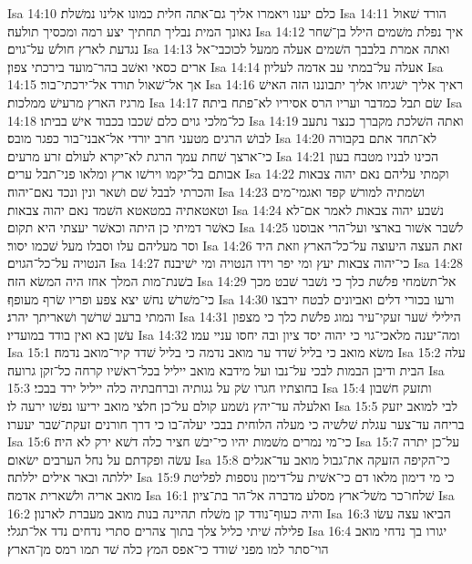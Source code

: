 Isa 14:10  כלם יענו ויאמרו אליך גם־אתה חלית כמונו אלינו נמשׁלת׃
Isa 14:11  הורד שׁאול גאונך המית נבליך תחתיך יצע רמה ומכסיך תולעה׃
Isa 14:12  איך נפלת משׁמים הילל בן־שׁחר נגדעת לארץ חולשׁ על־גוים׃
Isa 14:13  ואתה אמרת בלבבך השׁמים אעלה ממעל לכוכבי־אל ארים כסאי ואשׁב בהר־מועד בירכתי צפון׃
Isa 14:14  אעלה על־במתי עב אדמה לעליון׃
Isa 14:15  אך אל־שׁאול תורד אל־ירכתי־בור׃
Isa 14:16  ראיך אליך ישׁגיחו אליך יתבוננו הזה האישׁ מרגיז הארץ מרעישׁ ממלכות׃
Isa 14:17  שׂם תבל כמדבר ועריו הרס אסיריו לא־פתח ביתה׃
Isa 14:18  כל־מלכי גוים כלם שׁכבו בכבוד אישׁ בביתו׃
Isa 14:19  ואתה השׁלכת מקברך כנצר נתעב לבושׁ הרגים מטעני חרב יורדי אל־אבני־בור כפגר מובס׃
Isa 14:20  לא־תחד אתם בקבורה כי־ארצך שׁחת עמך הרגת לא־יקרא לעולם זרע מרעים׃
Isa 14:21  הכינו לבניו מטבח בעון אבותם בל־יקמו וירשׁו ארץ ומלאו פני־תבל ערים׃
Isa 14:22  וקמתי עליהם נאם יהוה צבאות והכרתי לבבל שׁם ושׁאר ונין ונכד נאם־יהוה׃
Isa 14:23  ושׂמתיה למורשׁ קפד ואגמי־מים וטאטאתיה במטאטא השׁמד נאם יהוה צבאות׃
Isa 14:24  נשׁבע יהוה צבאות לאמר אם־לא כאשׁר דמיתי כן היתה וכאשׁר יעצתי היא תקום׃
Isa 14:25  לשׁבר אשׁור בארצי ועל־הרי אבוסנו וסר מעליהם עלו וסבלו מעל שׁכמו יסור׃
Isa 14:26  זאת העצה היעוצה על־כל־הארץ וזאת היד הנטויה על־כל־הגוים׃
Isa 14:27  כי־יהוה צבאות יעץ ומי יפר וידו הנטויה ומי ישׁיבנה׃
Isa 14:28  בשׁנת־מות המלך אחז היה המשׂא הזה׃
Isa 14:29  אל־תשׂמחי פלשׁת כלך כי נשׁבר שׁבט מכך כי־משׁרשׁ נחשׁ יצא צפע ופריו שׂרף מעופף׃
Isa 14:30  ורעו בכורי דלים ואביונים לבטח ירבצו והמתי ברעב שׁרשׁך ושׁאריתך יהרג׃
Isa 14:31  הילילי שׁער זעקי־עיר נמוג פלשׁת כלך כי מצפון עשׁן בא ואין בודד במועדיו׃
Isa 14:32  ומה־יענה מלאכי־גוי כי יהוה יסד ציון ובה יחסו עניי עמו׃
Isa 15:1  משׂא מואב כי בליל שׁדד ער מואב נדמה כי בליל שׁדד קיר־מואב נדמה׃
Isa 15:2  עלה הבית ודיבן הבמות לבכי על־נבו ועל מידבא מואב ייליל בכל־ראשׁיו קרחה כל־זקן גרועה׃
Isa 15:3  בחוצתיו חגרו שׂק על גגותיה וברחבתיה כלה ייליל ירד בבכי׃
Isa 15:4  ותזעק חשׁבון ואלעלה עד־יהץ נשׁמע קולם על־כן חלצי מואב יריעו נפשׁו ירעה לו׃
Isa 15:5  לבי למואב יזעק בריחה עד־צער עגלת שׁלשׁיה כי מעלה הלוחית בבכי יעלה־בו כי דרך חורנים זעקת־שׁבר יעערו׃
Isa 15:6  כי־מי נמרים משׁמות יהיו כי־יבשׁ חציר כלה דשׁא ירק לא היה׃
Isa 15:7  על־כן יתרה עשׂה ופקדתם על נחל הערבים ישׂאום׃
Isa 15:8  כי־הקיפה הזעקה את־גבול מואב עד־אגלים יללתה ובאר אילים יללתה׃
Isa 15:9  כי מי דימון מלאו דם כי־אשׁית על־דימון נוספות לפליטת מואב אריה ולשׁארית אדמה׃
Isa 16:1  שׁלחו־כר משׁל־ארץ מסלע מדברה אל־הר בת־ציון׃
Isa 16:2  והיה כעוף־נודד קן משׁלח תהיינה בנות מואב מעברת לארנון׃
Isa 16:3  הביאו עצה עשׂו פלילה שׁיתי כליל צלך בתוך צהרים סתרי נדחים נדד אל־תגלי׃
Isa 16:4  יגורו בך נדחי מואב הוי־סתר למו מפני שׁודד כי־אפס המץ כלה שׁד תמו רמס מן־הארץ׃
